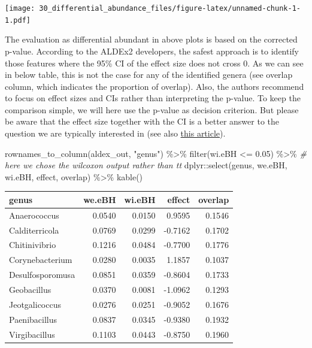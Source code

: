 \documentclass[
]{book}
\newenvironment{Shaded}{\begin{snugshade}}{\end{snugshade}}
\newcommand{\CommentTok}[1]{\textcolor[rgb]{0.56,0.35,0.01}{\textit{#1}}}
\newcommand{\FloatTok}[1]{\textcolor[rgb]{0.00,0.00,0.81}{#1}}
\newcommand{\FunctionTok}[1]{\textcolor[rgb]{0.00,0.00,0.00}{#1}}
\newcommand{\NormalTok}[1]{#1}
\newcommand{\SpecialCharTok}[1]{\textcolor[rgb]{0.00,0.00,0.00}{#1}}
\newcommand{\StringTok}[1]{\textcolor[rgb]{0.31,0.60,0.02}{#1}}
\begin{document}
\texttt{[image: 30\_differential\_abundance\_files/figure-latex/unnamed-chunk-1-1.pdf]}

The evaluation as differential abundant in above plots is based on the
corrected p-value. According to the ALDEx2 developers, the safest
approach is to identify those features where the 95\% CI of the effect
size does not cross 0. As we can see in below table, this is not the
case for any of the identified genera (see overlap column, which
indicates the proportion of overlap). Also, the authors recommend to
focus on effect sizes and CIs rather than interpreting the p-value. To
keep the comparison simple, we will here use the p-value as decision
criterion. But please be aware that the effect size together with the
CI is a better answer to the question we are typically interested in
(see also \href{https://www.nature.com/articles/d41586-019-00857-9}{this
article}).

\begin{Shaded}
\begin{Highlighting}[]
\FunctionTok{rownames\_to\_column}\NormalTok{(aldex\_out, }\StringTok{"genus"}\NormalTok{) }\SpecialCharTok{\%\textgreater{}\%}
  \FunctionTok{filter}\NormalTok{(wi.eBH }\SpecialCharTok{\textless{}=} \FloatTok{0.05}\NormalTok{)  }\SpecialCharTok{\%\textgreater{}\%} \CommentTok{\# here we chose the wilcoxon output rather than tt}
\NormalTok{  dplyr}\SpecialCharTok{::}\FunctionTok{select}\NormalTok{(genus, we.eBH, wi.eBH, effect, overlap) }\SpecialCharTok{\%\textgreater{}\%}
  \FunctionTok{kable}\NormalTok{()}
\end{Highlighting}
\end{Shaded}

\begin{tabular}{l|r|r|r|r}
\hline
genus & we.eBH & wi.eBH & effect & overlap\\
\hline
Anaerococcus & 0.0540 & 0.0150 & 0.9595 & 0.1546\\
\hline
Calditerricola & 0.0769 & 0.0299 & -0.7162 & 0.1702\\
\hline
Chitinivibrio & 0.1216 & 0.0484 & -0.7700 & 0.1776\\
\hline
Corynebacterium & 0.0280 & 0.0035 & 1.1857 & 0.1037\\
\hline
Desulfosporomusa & 0.0851 & 0.0359 & -0.8604 & 0.1733\\
\hline
Geobacillus & 0.0370 & 0.0081 & -1.0962 & 0.1293\\
\hline
Jeotgalicoccus & 0.0276 & 0.0251 & -0.9052 & 0.1676\\
\hline
Paenibacillus & 0.0837 & 0.0345 & -0.9380 & 0.1932\\
\hline
Virgibacillus & 0.1103 & 0.0443 & -0.8750 & 0.1960\\
\hline
\end{tabular}
\end{document}
